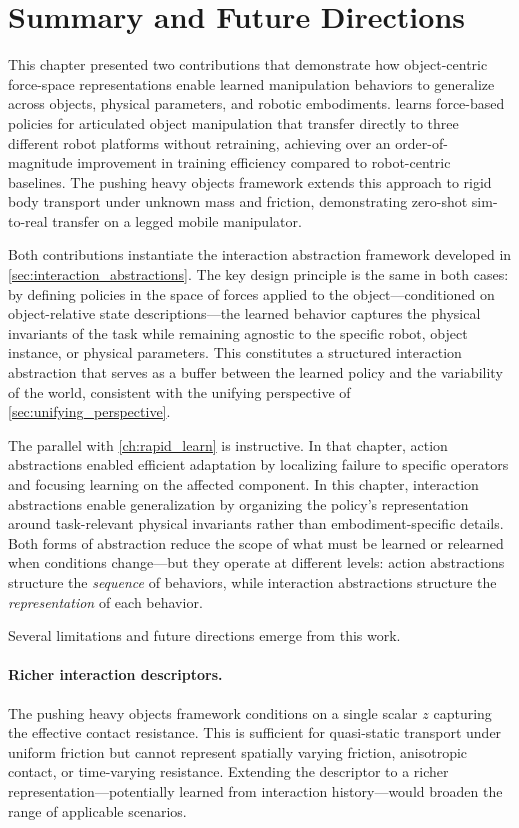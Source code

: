 \section{Summary and Future Directions}
\label{sec:gen_summary}

This chapter presented two contributions that demonstrate how object-centric force-space representations enable learned manipulation behaviors to generalize across objects, physical parameters, and robotic embodiments. \FLEX{} learns force-based policies for articulated object manipulation that transfer directly to three different robot platforms without retraining, achieving over an order-of-magnitude improvement in training efficiency compared to robot-centric baselines. The pushing heavy objects framework extends this approach to rigid body transport under unknown mass and friction, demonstrating zero-shot sim-to-real transfer on a legged mobile manipulator.

Both contributions instantiate the interaction abstraction framework developed in \cref{sec:interaction_abstractions}. The key design principle is the same in both cases: by defining policies in the space of forces applied to the object---conditioned on object-relative state descriptions---the learned behavior captures the physical invariants of the task while remaining agnostic to the specific robot, object instance, or physical parameters. This constitutes a structured interaction abstraction that serves as a buffer between the learned policy and the variability of the world, consistent with the unifying perspective of \cref{sec:unifying_perspective}.

The parallel with \cref{ch:rapid_learn} is instructive. In that chapter, action abstractions enabled efficient adaptation by localizing failure to specific operators and focusing learning on the affected component. In this chapter, interaction abstractions enable generalization by organizing the policy's representation around task-relevant physical invariants rather than embodiment-specific details. Both forms of abstraction reduce the scope of what must be learned or relearned when conditions change---but they operate at different levels: action abstractions structure the \emph{sequence} of behaviors, while interaction abstractions structure the \emph{representation} of each behavior.

Several limitations and future directions emerge from this work.

\paragraph{Richer interaction descriptors.} The pushing heavy objects framework conditions on a single scalar $z$ capturing the effective contact resistance. This is sufficient for quasi-static transport under uniform friction but cannot represent spatially varying friction, anisotropic contact, or time-varying resistance. Extending the descriptor to a richer representation---potentially learned from interaction history---would broaden the range of applicable scenarios.

